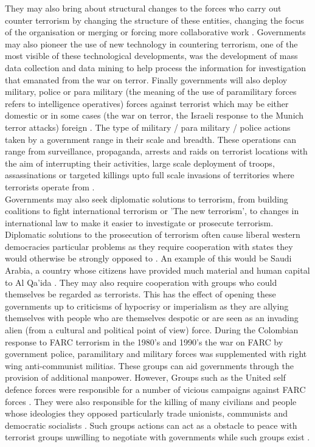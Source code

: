 They may also bring about structural changes to the forces who carry out counter terrorism by changing the structure of these entities, changing the focus of the organisation or merging or forcing more collaborative work \citep{jamwal2003counter}. Governments may also pioneer the use of  new technology in countering terrorism, one of the most visible of these technological developments, was the development of mass data collection and data mining to help process the information for investigation that emanated from the war on terror. Finally governments will also deploy military, police or para military (the meaning of the use of paramilitary forces refers to intelligence operatives) forces against terrorist which may be either domestic or in some cases (the war on terror, the Israeli response to the Munich terror attacks) foreign \citep{calahan1995countering}. The type of military / para military / police actions taken by a government range in their scale and breadth. These operations can range from surveillance, propaganda, arrests and raids on terrorist locations with the aim of interrupting their activities, large scale deployment of troops, assassinations or targeted killings upto full scale invasions of territories where terrorists operate from \citep{conetta2002strange}. 
\\
Governments may also seek diplomatic solutions to terrorism, from building coalitions to fight international terrorism or 'The new terrorism', to changes in international law to make it easier to investigate or prosecute terrorism. Diplomatic solutions to the prosecution of terrorism often cause liberal western democracies particular problems as they require cooperation with states they would otherwise be strongly opposed to \citep{jarvis2014critical}. An example of this would be Saudi Arabia, a country whose citizens have provided much material and human capital to Al Qa'ida \citep{abuza2003funding}. They may also require cooperation with groups who could themselves be regarded as terrorists. This has the effect of opening these governments up to criticisms of hypocrisy or imperialism as they are allying themselves with people who are themselves despotic or are seen as an invading alien (from a cultural and political point of view) force. During the Colombian response to FARC terrorism in the 1980's and 1990's  the war on FARC by government police, paramilitary and military forces was supplemented with right wing anti-communist militias. These groups can aid governments through the provision of additional manpower. However, Groups such as the United self defence forces were responsible for a number of vicious campaigns against FARC forces \citep{ColombiaRightWingTerror}. They were also responsible for the killing of many civilians and people whose ideologies they opposed particularly trade unionists, communists and democratic socialists \citep{peceny2006farc}. Such groups actions can act as a obstacle to peace with terrorist groups unwilling to negotiate with governments while such groups exist \citep{ColombiaAUCFARC}.
